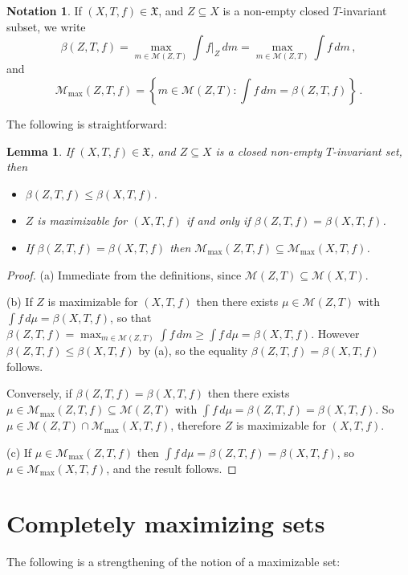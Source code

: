\documentclass[reqno,11pt]{amsart}
\newtheorem{lem}[thm]{Lemma}
\theoremstyle{definition}
\newtheorem{notation}[thm]{Notation}
\theoremstyle{remark}
\theoremstyle{remark}
\def\m{\mathcal M}
\def\X{\mathfrak{X}}
\numberwithin{equation}{section}
\begin{document}
\begin{notation}
If $(X,T,f)\in\X$, 
and $Z\subseteq X$ is a non-empty closed $T$-invariant subset, we write
$$
\beta\left(Z,T,f\right)
= \max_{m\in\m(Z,T)} \int f|_Z\, dm
= \max_{m\in\m(Z,T)} \int f\, dm\,,
$$
and
$$
\m_{\max}(Z,T,f)
= \left\{ m\in\m(Z,T):  \int f\, dm = \beta\left(Z,T,f\right) \right\} \,.
$$
\end{notation}




The following is straightforward:

\begin{lem}\label{obvious}
If $(X,T,f)\in\X$,
and $Z\subseteq X$ is a closed non-empty $T$-invariant set, then
\begin{itemize}
\item[(a)] $\beta(Z,T,f) \le \beta(X,T,f)$.
\item[(b)] $Z$ is maximizable for $(X,T,f)$ if and only if $\beta(Z,T,f) = \beta(X,T,f)$.
\item[(c)] If  $\beta(Z,T,f) = \beta(X,T,f)$
then
$\m_{\max}(Z, T,f) \subseteq  \m_{\max}(X, T,f)$.
\end{itemize}
\end{lem}
\begin{proof}
(a) Immediate from the definitions, since $\m(Z,T)\subseteq\m(X,T)$.

(b) If $Z$ is maximizable for $(X,T,f)$ then there exists $\mu\in\m(Z,T)$ with $\int f\, d\mu=\beta(X,T,f)$, so that
$\beta(Z,T,f)=\max_{m\in\m(Z,T)}\int f\, dm\ge \int f\, d\mu=\beta(X,T,f)$. 
However $\beta(Z,T,f) \le \beta(X,T,f)$ by (a), so the equality $\beta(Z,T,f) = \beta(X,T,f)$ follows.

Conversely, if $\beta(Z,T,f) = \beta(X,T,f)$ then there exists $\mu \in \m_{\max}(Z,T,f)\subseteq \m(Z,T)$ 
with $\int f \, d\mu = \beta(Z,T,f)=\beta(X,T,f)$. 
So $\mu\in\m(Z,T)\cap \m_{\max}(X,T,f)$, therefore $Z$ is maximizable for $(X,T,f)$.

(c) If $\mu\in\m_{\max}(Z,T,f)$ then $\int f\, d\mu=\beta(Z,T,f) = \beta(X,T,f)$, so $\mu\in\m_{\max}(X,T,f)$,
 and the result follows.
\end{proof}




\section{ Completely maximizing sets}\label{completelymaximizingsetssection}

The following 
is a strengthening of the notion of a maximizable set:
\end{document}
